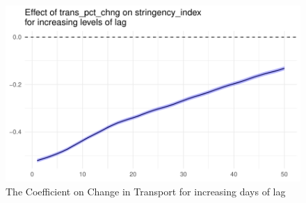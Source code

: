 \documentclass[
  12pt,
]{article}
\begin{document}
\begin{figure}
\includegraphics[width=0.8\linewidth]{write_up_test_files/figure-latex/lag-trans-1} \caption{The Coefficient on Change in Transport for increasing days of lag}\label{fig:lag-trans}
\end{figure}
\end{document}
